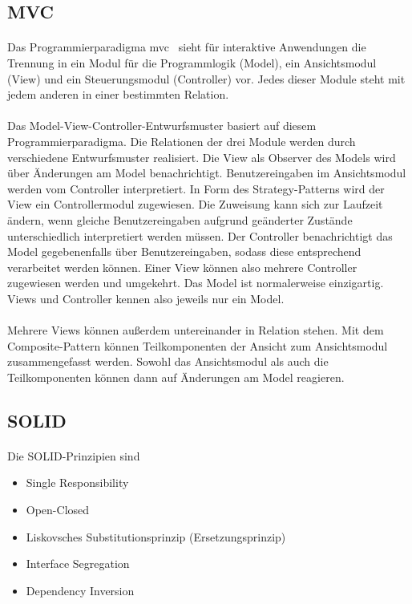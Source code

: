 \documentclass{article}
\begin{document}
\subsection{MVC}
\paragraph{}
Das Programmierparadigma \gls{mvc}~\autocite[S.~26--49]{KraPo88} sieht für interaktive Anwendungen die Trennung in ein Modul für die Programmlogik (Model), ein Ansichtsmodul (View) und ein Steuerungsmodul (Controller) vor. Jedes dieser Module steht mit jedem anderen in einer bestimmten Relation.
\paragraph{}
Das Model-View-Controller-Entwurfsmuster basiert auf diesem Programmierparadigma. Die Relationen der drei Module werden durch verschiedene Entwurfsmuster realisiert. Die View als Observer \autocite[S.~293--305]{GoF94} des Models wird über Änderungen am Model benachrichtigt. Benutzereingaben im Ansichtsmodul werden vom Controller interpretiert. In Form des Strategy-Patterns \autocite[S.~315--325]{GoF94} wird der View ein Controllermodul zugewiesen. Die Zuweisung kann sich zur Laufzeit ändern, wenn gleiche Benutzereingaben aufgrund geänderter Zustände unterschiedlich interpretiert werden müssen. Der Controller benachrichtigt das Model gegebenenfalls über Benutzereingaben, sodass diese entsprechend verarbeitet werden können. Einer View können also mehrere Controller zugewiesen werden und umgekehrt. Das Model ist normalerweise einzigartig. Views und Controller kennen also jeweils nur ein Model.
\paragraph{}
Mehrere Views können außerdem untereinander in Relation stehen. Mit dem Composite-Pattern \autocite[S.~163--175]{GoF94} können Teilkomponenten der Ansicht zum Ansichtsmodul zusammengefasst werden. Sowohl das Ansichtsmodul als auch die Teilkomponenten können dann auf Änderungen am Model reagieren.

\subsection{SOLID}
\paragraph{}
Die SOLID-Prinzipien sind
\begin{itemize}[noitemsep]
\item Single Responsibility
\item Open-Closed
\item Liskovsches Substitutionsprinzip (Ersetzungsprinzip)
\item Interface Segregation
\item Dependency Inversion
\end{itemize}
\end{document}
